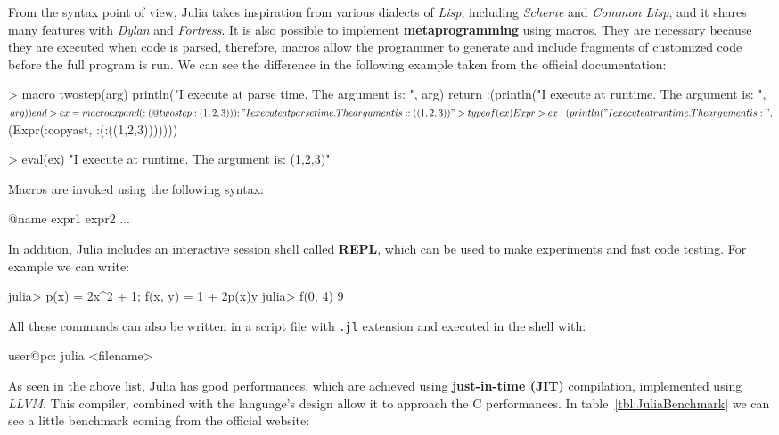 From the syntax point of view, Julia takes inspiration from various dialects of \textit{Lisp}, including \textit{Scheme} and \textit{Common Lisp}, and it shares many features with \textit{Dylan} and \textit{Fortress}. It is also possible to implement \textbf{metaprogramming} using macros. They are necessary because they are executed when code is parsed, therefore, macros allow the programmer to generate and include fragments of customized code before the full program is run. We can see the difference in the following example taken from the official documentation:\\

\begin{julia}
 > macro twostep(arg)
     println("I execute at parse time. The argument is: ", arg)
     return :(println("I execute at runtime. The argument is: ", $arg))
   end
 
 > ex = macroexpand( :(@twostep :(1, 2, 3)) );
   "I execute at parse time. The argument is: :((1,2,3))"
 
 > typeof(ex)
   Expr

 > ex
   :(println("I execute at runtime. The argument is: ",$(Expr(:copyast, :(:((1,2,3)))))))

 > eval(ex)
   "I execute at runtime. The argument is: (1,2,3)"
\end{julia}

Macros are invoked using the following syntax:
\begin{julia}
 @name expr1 expr2 ...
\end{julia}

In addition, Julia includes an interactive session shell called \textbf{REPL}, which can be used to make experiments and fast code testing. For example we can write:
\begin{julia}
 julia> p(x) = 2x^2 + 1; f(x, y) = 1 + 2p(x)y
 julia> f(0, 4)
 9
\end{julia}

All these commands can also be written in a script file with \texttt{.jl} extension and executed in the shell with:
\begin{julia}
 user@pc: julia <filename>
\end{julia}

As seen in the above list, Julia has good performances, which are achieved using \textbf{just-in-time (JIT)} compilation, implemented using \textit{LLVM}. This compiler, combined with the language's design allow it to approach the C performances. In table~\ref{tbl:JuliaBenchmark} we can see a little benchmark coming from the official website:

